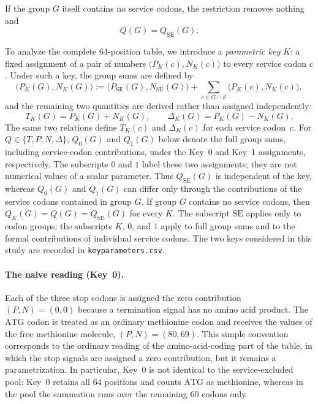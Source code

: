 \documentclass[11pt,a4paper]{article}
\renewcommand{\_}{\origunderscore\allowbreak}
\begin{document}
If the group $G$ itself contains no service codons, the restriction
removes nothing and
\[
Q(G)=Q_{\mathrm{SE}}(G).
\]

To analyze the complete 64-position table, we introduce a
\emph{parametric key} $K$: a fixed assignment of a pair of numbers
$\bigl(P_K(c),N_K(c)\bigr)$ to every service codon $c$.
Under such a key, the group sums are defined by
\[
\bigl(P_K(G),N_K(G)\bigr)
:=
\bigl(P_{\mathrm{SE}}(G),N_{\mathrm{SE}}(G)\bigr)
+
\sum_{c\in G\cap\mathcal{S}}
\bigl(P_K(c),N_K(c)\bigr),
\]
and the remaining two quantities are derived rather than assigned
independently:
\[
T_K(G)=P_K(G)+N_K(G),
\qquad
\Delta_K(G)=P_K(G)-N_K(G).
\]
The same two relations define $T_K(c)$ and $\Delta_K(c)$ for each
service codon~$c$.
For $Q\in\{T,P,N,\Delta\}$, $Q_0(G)$ and $Q_1(G)$ below denote the
full group sums, including service-codon contributions, under the
Key~0 and Key~1 assignments, respectively. The subscripts $0$ and $1$
label these two assignments; they are not numerical values of a
scalar parameter. Thus $Q_{\mathrm{SE}}(G)$ is independent of the key,
whereas $Q_0(G)$ and $Q_1(G)$ can differ only through the
contributions of the service codons contained in group $G$. If group
$G$ contains no service codons, then
$Q_K(G)=Q(G)=Q_{\mathrm{SE}}(G)$ for every $K$. The subscript
$\mathrm{SE}$ applies only to codon groups; the subscripts $K$, $0$,
and $1$ apply to full group sums and to the formal contributions of
individual service codons. The two keys considered in this study are
recorded in \texttt{key\_parameters.csv}.

\paragraph{The naive reading (Key~0).}
Each of the three stop codons is assigned the zero contribution
$(P,N)=(0,0)$ because a termination signal has no amino acid product.
The $\mathrm{ATG}$ codon is treated as an ordinary methionine codon
and receives the values of the free methionine molecule,
$(P,N)=(80,69)$. This simple convention corresponds to the ordinary reading of the
amino-acid-coding part of the table, in which the stop signals are
assigned a zero contribution, but it remains a parametrization. In
particular, Key~0 is not identical to the service-excluded pool:
Key~0 retains all $64$ positions and counts $\mathrm{ATG}$ as
methionine, whereas in the pool the summation runs over the remaining
$60$ codons only.
\end{document}
